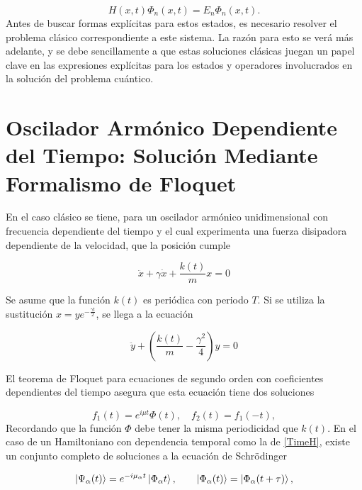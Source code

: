 \documentclass[10pt,a4paper]{report}
\begin{document}
\begin{equation}
H(x,t)\Phi_n(x,t)=E_n\Phi_n(x,t).
\end{equation} Antes de buscar formas explícitas para estos estados, es necesario resolver el problema clásico correspondiente a este sistema. La razón para esto se verá más adelante, y se debe sencillamente a que estas soluciones clásicas juegan un papel clave en las expresiones explícitas para los estados y operadores involucrados en la solución del problema cuántico.

\section{Oscilador Armónico Dependiente del Tiempo: Solución Mediante Formalismo de Floquet}

En el caso clásico \cite{HanngiFM} se tiene, para un oscilador armónico unidimensional con frecuencia dependiente del tiempo y el cual experimenta una fuerza disipadora dependiente de la velocidad, que la posición cumple

\begin{equation}
\ddot{x}+\gamma\dot{x}+\frac{k(t)}{m}x=0
\end{equation}

Se asume que la función $k(t)$ es periódica con periodo $T$. Si se utiliza la sustitución $x=ye^{-\frac{\gamma t}{2}}$, se llega a la ecuación

\begin{equation}
\ddot{y} +(\frac{k(t)}{m}-\frac{\gamma^2}{4})y=0
\end{equation}

El teorema de Floquet para ecuaciones de segundo orden con
coeficientes dependientes del tiempo \cite{HanngiFM} asegura
que esta ecuación tiene dos soluciones

\begin{equation}
f_1(t) = e^{i\mu t}\Phi(t), \quad f_2(t)=f_1(-t),
\end{equation}
Recordando que la función $\Phi$ debe tener la misma periodicidad que
$k(t)$. En el caso de un Hamiltoniano con dependencia temporal como la de \eqref{TimeH}, existe un conjunto completo de soluciones a la ecuación de Schr\"{o}dinger
\cite{BarnettSD}

\begin{equation}
\Ket{\Psi_\alpha (t)} = e^{-i\mu_\alpha t}\Ket{\Phi_\alpha t}, \qquad \Ket{\Phi_\alpha (t)}=\Ket{\Phi_\alpha (t+\tau)},
\end{equation}
\end{document}

